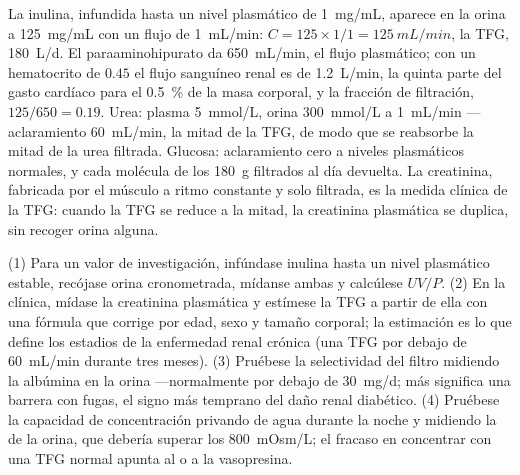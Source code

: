 \begin{example}\label{ex:b3:renal-osmoregulation:numbers}
La inulina, infundida hasta un nivel plasmático de \qty{1}{mg/mL},
aparece en la orina a \qty{125}{mg/mL} con un flujo de \qty{1}{mL/min}: $C = 125\times 1/1 =
\qty{125}{mL/min}$, la TFG, \qty{180}{L/d}. El paraaminohipurato da
\qty{650}{mL/min}, el flujo plasmático; con un hematocrito de $0.45$ el
flujo sanguíneo renal es de \qty{1.2}{L/min}, la quinta parte del gasto
cardíaco para el \qty{0.5}{\%} de la masa corporal, y la fracción de
filtración, $125/650 = 0.19$. Urea: plasma \qty{5}{mmol/L}, orina
\qty{300}{mmol/L} a \qty{1}{mL/min} ---aclaramiento \qty{60}{mL/min},
la mitad de la TFG, de modo que se reabsorbe la mitad de la urea
filtrada. Glucosa: aclaramiento cero a niveles plasmáticos normales, y
cada molécula de los \qty{180}{g} filtrados al día devuelta. La
creatinina, fabricada por el músculo a ritmo constante y solo filtrada,
es la medida clínica de la TFG: cuando la TFG se reduce a la mitad, la
creatinina plasmática se duplica, sin recoger orina alguna.
\end{example}

\begin{method}\label{met:b3:renal-osmoregulation:gfr}
(1) Para un valor de investigación, infúndase inulina hasta un nivel
plasmático estable, recójase orina cronometrada, mídanse ambas y
calcúlese $UV/P$. (2) En la clínica, mídase la creatinina plasmática y
estímese la TFG a partir de ella con una fórmula que corrige por edad,
sexo y tamaño corporal; la estimación es lo que define los estadios de
la enfermedad renal crónica (una TFG por debajo de \qty{60}{mL/min}
durante tres meses). (3) Pruébese la selectividad del filtro midiendo
la albúmina en la orina ---normalmente por debajo de \qty{30}{mg/d};
más significa una barrera con fugas, el signo más temprano del daño
renal diabético. (4) Pruébese la capacidad de concentración privando de
agua durante la noche y midiendo la  de la orina, que
debería superar los \qty{800}{mOsm/L}; el fracaso en concentrar con una
TFG normal apunta al  o a la vasopresina.
\end{method}

